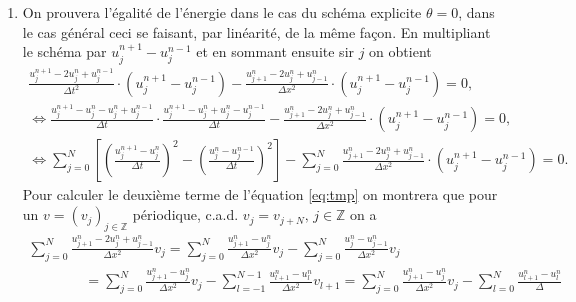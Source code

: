 \documentclass[12pt,a4paper]{article}
\begin{document}
\begin{enumerate}
$$
|G_j(k)|^2 = |G_1(k)G_2(k)|=\frac{1+4\theta s_k\sigma}{1+4\theta s_k\sigma}=1 \Rightarrow |G_j(k)|=1.
$$ 
ce qui prouve que le sch\'ema est stable inconditionnellement si
$\theta \ge 1/4$ et sous la condition \eqref{eq:cond} si $\theta <
1/4$. Dans le cas o\`u les racines de \eqref{eq:G} sont r\'eelles, ce qui
correspond au cas o\`u $(1-4\theta) s_k\sigma >
1$, le fait que le produit $G_1(k)G_2(k)=1$ prouve bien qu'il y en a une plus
grand en module que $1$, donc le sch\'ema est instable.
\item On prouvera l'\'egalit\'e de l'\'energie dans le cas du sch\'ema
  explicite $\theta=0$, dans le cas g\'en\'eral ceci se faisant, par
  lin\'earit\'e,  de la m\^eme fa\c{c}on. En multipliant le sch\'ema par
  $u_j^{n+1}-u_j^{n-1}$ et en sommant ensuite sir $j$ on obtient
\begin{equation}\label{eq:tmp}
\begin{array}{l}
\displaystyle\frac{u_j^{n+1}-2u_j^n+u_j^{n-1}}{\Delta t^2}\cdot
(u_j^{n+1}-u_j^{n-1})-\frac{u_{j+1}^{n}-2u_j^{n}+u_{j-1}^{n}}{\Delta
  x^2}\cdot (u_j^{n+1}-u_j^{n-1})=0,\\
\displaystyle\Leftrightarrow \frac{u_j^{n+1}-u_j^n-u_j^n + u_j^{n-1}}{\Delta t}\cdot
\frac{u_j^{n+1}-u_j^{n}  + u_j^{n} - u_j^{n-1}}{\Delta t} -\frac{u_{j+1}^{n}-2u_j^{n}+u_{j-1}^{n}}{\Delta x^2}\cdot
(u_j^{n+1}-u_j^{n-1})=0,\\
\displaystyle \Leftrightarrow \sum_{j=0}^N\left[\left(\frac{u_j^{n+1}-u_j^n}{\Delta
    t}\right)^2 - \left(\frac{u_j^{n}-u_j^{n-1}}{\Delta
    t}\right)^2 \right] -\sum_{j=0}^N \frac{u_{j+1}^{n}-2u_j^{n}+u_{j-1}^{n}}{\Delta x^2}\cdot
(u_j^{n+1}-u_j^{n-1})=0.
\end{array}
\end{equation}
Pour calculer le deuxi\`eme terme de l'\'equation \eqref{eq:tmp} on
montrera que pour un $v=(v_j)_{j\in\mathbb{Z}}$ p\'eriodique,
c.a.d. $v_j=v_{j+N},\, j\in\mathbb{Z}$ on a 
\begin{equation}\label{eq:tmp2}
\begin{array}{l}
\displaystyle\sum_{j=0}^N \frac{u_{j+1}^{n}-2u_j^{n}+u_{j-1}^{n}}{\Delta
  x^2}v_j=\displaystyle\sum_{j=0}^N \frac{u_{j+1}^{n}-u_j^{n}}{\Delta
  x^2}v_j-\sum_{j=0}^N \frac{u_{j}^{n}-u_{j-1}^{n}}{\Delta x^2}v_j\\
\qquad \qquad=\displaystyle\sum_{j=0}^N \frac{u_{j+1}^{n}-u_j^{n}}{\Delta
  x^2}v_j-\sum_{l=-1}^{N-1} \frac{u_{l+1}^{n}-u_{l}^{n}}{\Delta
  x^2}v_{l+1} = \displaystyle \sum_{j=0}^N \frac{u_{j+1}^{n}-u_j^{n}}{\Delta
  x^2}v_j-\sum_{l=0}^{N} \frac{u_{l+1}^{n}-u_{l}^{n}}{\Delta
}
\end{array}
\end{equation}
\end{enumerate}
\end{document}
